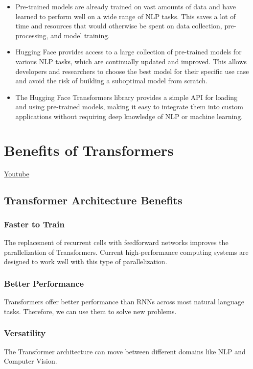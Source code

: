 \begin{itemize}
    \item Pre-trained models are already trained on vast amounts of data and have learned to perform well on a wide range of NLP tasks. This saves a lot of time and resources that would otherwise be spent on data collection, pre-processing, and model training.
    \item Hugging Face provides access to a large collection of pre-trained models for various NLP tasks, which are continually updated and improved. This allows developers and researchers to choose the best model for their specific use case and avoid the risk of building a suboptimal model from scratch.
    \item The Hugging Face Transformers library provides a simple API for loading and using pre-trained models, making it easy to integrate them into custom applications without requiring deep knowledge of NLP or machine learning.
\end{itemize}

\section{Benefits of Transformers}
\href{https://www.youtube.com/watch?v=lScR6pQPq9g}{Youtube} 
\subsection{Transformer Architecture Benefits}

\subsubsection{Faster to Train}
The replacement of recurrent cells with feedforward networks improves the parallelization of Transformers. Current high-performance computing systems are designed to work well with this type of parallelization.

\subsubsection{Better Performance}
Transformers offer better performance than RNNs across most natural language tasks. Therefore, we can use them to solve new problems.

\subsubsection{Versatility}
The Transformer architecture can move between different domains like NLP and Computer Vision.

